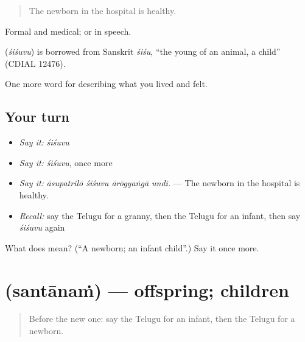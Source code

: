 \begin{quote}
The newborn in the hospital is healthy.
\end{quote}

Formal and medical;  or  in speech.

\begin{cousinweb}
\textbf{} (\emph{śiśuvu}) is borrowed from Sanskrit \emph{śiśu}, \textquotedblleft{}the young of an animal, a child\textquotedblright{} (CDIAL 12476).
\end{cousinweb}

\begin{grammarlens}[title={What you've built}]
One more word for describing what you lived and felt.
\end{grammarlens}

\subsection*{Your turn}
\begin{itemize}
\raggedright
  \item \emph{Say it:} \emph{śiśuvu}
  \item \emph{Say it:} \emph{śiśuvu}, once more
  \item \emph{Say it:} \emph{āsupatrilō śiśuvu ārōgyaṅgā undi.} — The newborn in the hospital is healthy.
  \item \emph{Recall:} say the Telugu for a granny, then the Telugu for an infant, then say \emph{śiśuvu} again
\end{itemize}

\begin{tcolorbox}[breakable,colback=teal!4,colframe=teal!35!black,title={Before you move on}]
What does  mean? (\textquotedblleft{}A newborn; an infant child\textquotedblright{}.) Say it once more.
\end{tcolorbox}
\section[\texorpdfstring{\te{సంతానం} (santānaṁ)}{సంతానం (santānaṁ)}]{ (santānaṁ) — offspring; children}

\label{lesson:TE-C531-santanam}



\begin{quote}
Before the new one: say the Telugu for an infant, then the Telugu for a newborn.
\end{quote}

